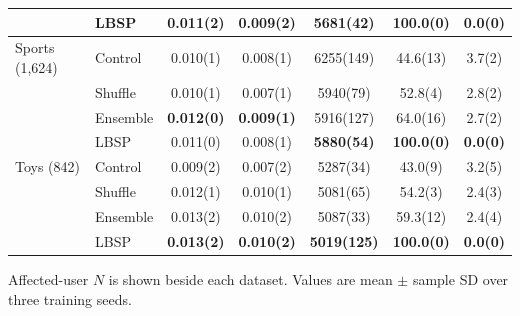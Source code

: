 \begin{table}[!htbp]
\begin{tabular*}{\textwidth}{@{\extracolsep{\fill}}llS[table-format=1.3(3)]S[table-format=1.3(3)]S[table-format=5.0(5)]S[table-format=3.1(3)]S[table-format=2.1(3)]@{}}
 & LBSP & 0.011(2) & 0.009(2) & 5681(42) & \bfseries 100.0(0) & \bfseries 0.0(0)\\ %
\midrule
Sports (1,624) & Control & 0.010(1) & 0.008(1) & 6255(149) & 44.6(13) & 3.7(2)\\ %
 & Shuffle & 0.010(1) & 0.007(1) & 5940(79) & 52.8(4) & 2.8(2)\\ %
 & Ensemble & \bfseries 0.012(0) & \bfseries 0.009(1) & 5916(127) & 64.0(16) & 2.7(2)\\ %
 & LBSP & 0.011(0) & 0.008(1) & \bfseries 5880(54) & \bfseries 100.0(0) & \bfseries 0.0(0)\\ %
\midrule
Toys (842) & Control & 0.009(2) & 0.007(2) & 5287(34) & 43.0(9) & 3.2(5)\\ %
 & Shuffle & 0.012(1) & 0.010(1) & 5081(65) & 54.2(3) & 2.4(3)\\ %
 & Ensemble & 0.013(2) & 0.010(2) & 5087(33) & 59.3(12) & 2.4(4)\\ %
 & LBSP & \bfseries 0.013(2) & \bfseries 0.010(2) & \bfseries 5019(125) & \bfseries 100.0(0) & \bfseries 0.0(0)\\ %
\bottomrule
\end{tabular*}
\par\smallskip\noindent\begin{minipage}{\textwidth}\fontsize{8.5}{11}\selectfont Affected-user $N$ is shown beside each dataset. Values are mean $\pm$ sample SD over three training seeds.
\end{minipage}
\end{table}

